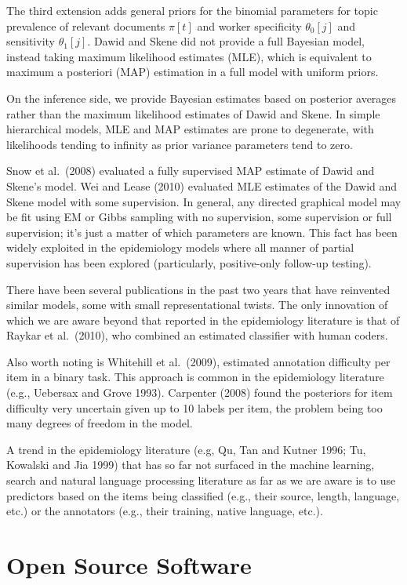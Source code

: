\documentclass{article}
\begin{document}
The third extension adds general priors for the binomial parameters
for topic prevalence of relevant documents $\pi[t]$ and worker
specificity $\theta_0[j]$ and sensitivity $\theta_1[j]$.  Dawid and
Skene did not provide a full Bayesian model, instead taking maximum
likelihood estimates (MLE), which is equivalent to maximum
a posteriori (MAP) estimation in a full model with uniform priors.

On the inference side, we provide Bayesian estimates based on 
posterior averages rather than the maximum likelihood estimates
of Dawid and Skene.  In simple hierarchical models, MLE and MAP estimates are
prone to degenerate, with likelihoods tending to infinity as 
prior variance parameters tend to zero.

Snow et al.~(2008) evaluated a fully supervised MAP estimate of Dawid
and Skene's model.  Wei and Lease (2010) evaluated MLE estimates of
the Dawid and Skene model with some supervision.  In general, any
directed graphical model may be fit using EM or Gibbs sampling with
no supervision, some supervision or full supervision; it's just a
matter of which parameters are known.   This fact has been widely
exploited in the epidemiology models where all manner of partial
supervision has been explored (particularly, positive-only follow-up
testing).

There have been several publications in the past two years that have
reinvented similar models, some with small representational twists.
The only innovation of which we are aware beyond that reported in the
epidemiology literature is that of Raykar et al.~(2010), who combined
an estimated classifier with human coders.

Also worth noting is Whitehill et al.~(2009), estimated annotation
difficulty per item in a binary task.  This approach is common
in the epidemiology literature (e.g., Uebersax and Grove 1993).
Carpenter (2008) found the posteriors for item difficulty very
uncertain given up to 10 labels per item, the problem being too many
degrees of freedom in the model.  

A trend in the epidemiology literature (e.g, Qu, Tan and Kutner 1996;
Tu, Kowalski and Jia 1999) that has so far not surfaced in the machine
learning, search and natural language processing literature as far as
we are aware is to use predictors based on the items being classified
(e.g., their source, length, language, etc.)  or the annotators (e.g.,
their training, native language, etc.).


\section{Open Source Software}
\end{document}
